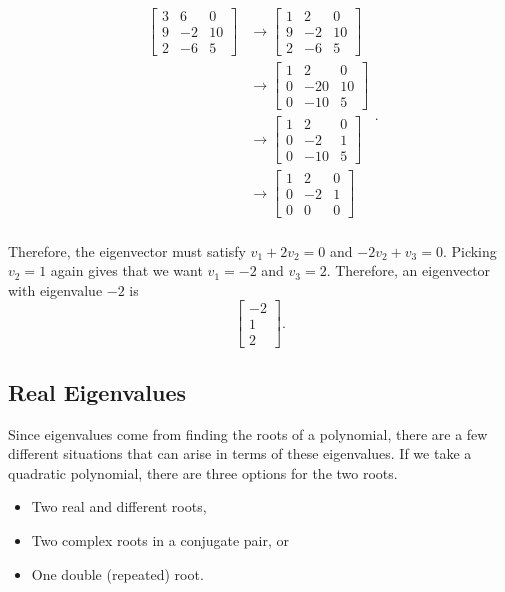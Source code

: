 \begin{exampleSol}
\[ \begin{split}
\begin{bmatrix} 3 & 6 & 0 \\ 9 & -2 & 10 \\ 2 & -6 & 5 \end{bmatrix}  &\rightarrow \begin{bmatrix} 1 & 2 & 0 \\ 9 & -2 & 10 \\ 2 & -6 & 5 \end{bmatrix} \\
 &\rightarrow \begin{bmatrix} 1 & 2 & 0 \\ 0 & -20 & 10 \\ 0 & -10 & 5 \end{bmatrix} \\
 &\rightarrow \begin{bmatrix} 1 & 2 & 0 \\ 0 & -2 & 1 \\ 0 & -10 & 5 \end{bmatrix} \\
  &\rightarrow \begin{bmatrix} 1 & 2 & 0 \\ 0 & -2 & 1 \\ 0 & 0 & 0 \end{bmatrix} \\
\end{split}. \]

Therefore, the eigenvector must satisfy $v_1 + 2v_2 = 0$ and $-2v_2 + v_3 = 0$. Picking $v_2 = 1$ again gives that we want $v_1 = -2$ and $v_3 = 2$. Therefore, an eigenvector with eigenvalue $-2$ is 
\[ \begin{bmatrix} -2 \\ 1 \\ 2 \end{bmatrix}. \]
\end{exampleSol}

\subsection{Real Eigenvalues}

Since eigenvalues come from finding the roots of a polynomial, there are a few different situations that can arise in terms of these eigenvalues. If we take a quadratic polynomial, there are three options for the two roots. 
\begin{itemize}
\item Two real and different roots,
\item Two complex roots in a conjugate pair, or
\item One double (repeated) root.
\end{itemize}

